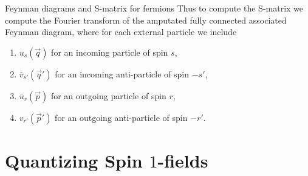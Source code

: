 \begin{mybox}{Feynman diagrams and S-matrix for fermions}
	Thus to compute the S-matrix we compute the Fourier transform of the amputated fully connected associated Feynman diagram, where for each external particle we include 
	\begin{enumerate}
		\item $u_s(\vec{q})$ for an incoming particle of spin $s$,
		\item $\bar{v}_{s'}(\vec{q}')$ for an incoming anti-particle of spin $-s'$,
		\item $\bar{u}_r(\vec{p})$ for an outgoing particle of spin $r$,
		\item $v_{r'}(\vec{p}')$ for an outgoing anti-particle of spin $-r'$.
	\end{enumerate}
\end{mybox}









\newpage 
\section{Quantizing Spin $1$-fields}
